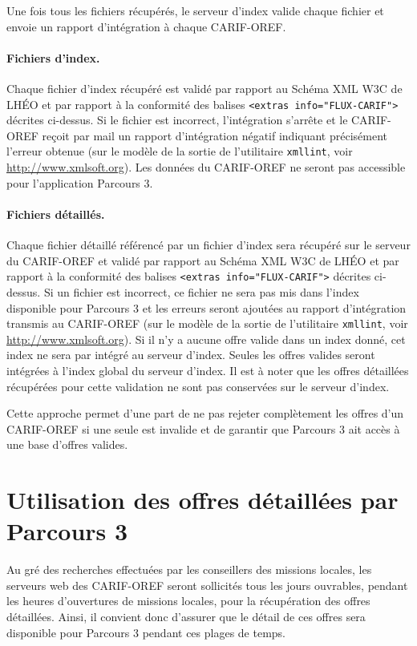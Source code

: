 \documentclass[a4paper]{report}
\begin{document}
Une fois tous les fichiers récupérés, le serveur d'index valide chaque
fichier et envoie un rapport d'intégration à chaque CARIF-OREF.

\paragraph{Fichiers d'index.} Chaque fichier d'index récupéré est
validé par rapport au Schéma XML W3C de LHÉO \cite{XSD-LHEO} et par
rapport à la conformité des balises \texttt{<extras
  info="FLUX-CARIF">} décrites ci-dessus. Si le fichier est incorrect,
l'intégration s'arrête et le CARIF-OREF reçoit par mail un rapport
d'intégration négatif indiquant précisément l'erreur obtenue (sur le
modèle de la sortie de l'utilitaire \texttt{xmllint}, voir
\url{http://www.xmlsoft.org}). Les données du CARIF-OREF ne seront pas
accessible pour l'application Parcours 3.

\paragraph{Fichiers détaillés.} Chaque fichier détaillé référencé par
un fichier d'index sera récupéré sur le serveur du CARIF-OREF et
validé par rapport au Schéma XML W3C de LHÉO \cite{XSD-LHEO} et par
rapport à la conformité des balises \texttt{<extras
  info="FLUX-CARIF">} décrites ci-dessus. Si un fichier est incorrect,
ce fichier ne sera pas mis dans l'index disponible pour Parcours 3 et
les erreurs seront ajoutées au rapport d'intégration transmis au
CARIF-OREF (sur le modèle de la sortie de l'utilitaire
\texttt{xmllint}, voir \url{http://www.xmlsoft.org}). Si il n'y a
aucune offre valide dans un index donné, cet index ne sera par intégré
au serveur d'index. Seules les offres valides seront intégrées à
l'index global du serveur d'index. Il est à noter que les offres
détaillées récupérées pour cette validation ne sont pas conservées sur
le serveur d'index.

Cette approche permet d'une part de ne pas rejeter complètement les
offres d'un CARIF-OREF si une seule est invalide et de garantir que
Parcours 3 ait accès à une base d'offres valides.

\section{Utilisation des offres détaillées par Parcours 3}

Au gré des recherches effectuées par les conseillers des missions
locales, les serveurs web des CARIF-OREF seront sollicités tous les
jours ouvrables, pendant les heures d'ouvertures de missions locales,
pour la récupération des offres détaillées. Ainsi, il convient donc
d'assurer que le détail de ces offres sera disponible pour Parcours 3
pendant ces plages de temps.
\end{document}

